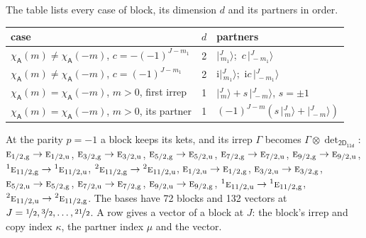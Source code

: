 \documentclass[10pt,a4paper]{article}
\numberwithin{equation}{section}
\newcommand{\grp}[1]{\mathsf{#1}}
\newcommand{\irr}[1]{\text{\normalfont\scshape #1}}
\newcommand{\conjpair}[1]{{}^{#1}}
\newcommand{\ptag}[1]{\mathrm{#1}}
\newcommand{\iunit}{\mathrm{i}}
\newcommand{\chiA}{\chi_{\grp{A}}}
\newcommand{\irrprod}{\otimes}
\newcommand{\mult}{\kappa}
\newcommand{\intx}{\mu}
\newcommand{\jm}[2]{\bigl\lvert{}^{#1}_{\,#2}\bigr\rangle}
\begin{document}
\leavevmode\label{n:head.case}\label{n:head.partners}The table lists every case of block, its dimension $d$ and its partners in order.
\begin{center}\begin{tabular}{@{}lrl@{}}\toprule
case & $d$ & partners\\\midrule
$\chiA(m) \ne \chiA(-m)$, $c = -(-1)^{J-m_1}$ & 2 & $\jm{J}{m_1}$;\ $c\,\jm{J}{-m_1}$\\
$\chiA(m) \ne \chiA(-m)$, $c = (-1)^{J-m_1}$ & 2 & $\iunit\jm{J}{m_1}$;\ $\iunit c\,\jm{J}{-m_1}$\\
$\chiA(m) = \chiA(-m)$, $m > 0$, first irrep & 1 & $\jm{J}{m} + s\,\jm{J}{-m}$, $s = \pm1$\\
$\chiA(m) = \chiA(-m)$, $m > 0$, its partner & 1 & $(-1)^{J-m}(s\,\jm{J}{m} + \jm{J}{-m})$\\
\bottomrule\end{tabular}\end{center}
At the parity $p = -1$ a block keeps its kets, and its irrep $\Gamma$ becomes $\Gamma \irrprod \det_{\grp{2D_{11d}}}$: $\irr{e}_{1/2,\ptag{g}} \to \irr{e}_{1/2,\ptag{u}}$, $\irr{e}_{3/2,\ptag{g}} \to \irr{e}_{3/2,\ptag{u}}$, $\irr{e}_{5/2,\ptag{g}} \to \irr{e}_{5/2,\ptag{u}}$, $\irr{e}_{7/2,\ptag{g}} \to \irr{e}_{7/2,\ptag{u}}$, $\irr{e}_{9/2,\ptag{g}} \to \irr{e}_{9/2,\ptag{u}}$, $\conjpair{1}\irr{e}_{11/2,\ptag{g}} \to \conjpair{1}\irr{e}_{11/2,\ptag{u}}$, $\conjpair{2}\irr{e}_{11/2,\ptag{g}} \to \conjpair{2}\irr{e}_{11/2,\ptag{u}}$, $\irr{e}_{1/2,\ptag{u}} \to \irr{e}_{1/2,\ptag{g}}$, $\irr{e}_{3/2,\ptag{u}} \to \irr{e}_{3/2,\ptag{g}}$, $\irr{e}_{5/2,\ptag{u}} \to \irr{e}_{5/2,\ptag{g}}$, $\irr{e}_{7/2,\ptag{u}} \to \irr{e}_{7/2,\ptag{g}}$, $\irr{e}_{9/2,\ptag{u}} \to \irr{e}_{9/2,\ptag{g}}$, $\conjpair{1}\irr{e}_{11/2,\ptag{u}} \to \conjpair{1}\irr{e}_{11/2,\ptag{g}}$, $\conjpair{2}\irr{e}_{11/2,\ptag{u}} \to \conjpair{2}\irr{e}_{11/2,\ptag{g}}$.
The bases have 72 blocks and 132 vectors at $J = \nicefrac{1}{2}, \nicefrac{3}{2}, \dots, \nicefrac{21}{2}$. \label{n:head.vector}A row gives a vector of a block at $J$: the block's irrep and copy index $\mult$, the partner index $\intx$ and the vector.
\end{document}
